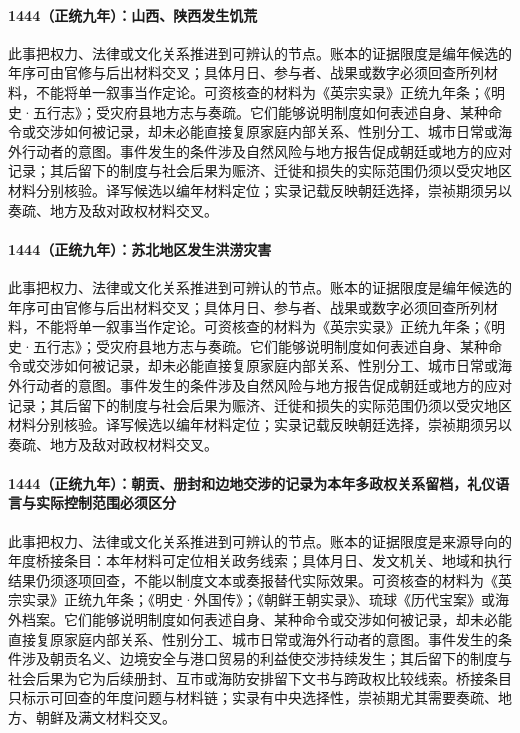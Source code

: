\paragraph{1444（正统九年）：山西、陕西发生饥荒} 此事把权力、法律或文化关系推进到可辨认的节点。账本的证据限度是编年候选的年序可由官修与后出材料交叉；具体月日、参与者、战果或数字必须回查所列材料，不能将单一叙事当作定论。可资核查的材料为《英宗实录》正统九年条；《明史·五行志》；受灾府县地方志与奏疏。它们能够说明制度如何表述自身、某种命令或交涉如何被记录，却未必能直接复原家庭内部关系、性别分工、城市日常或海外行动者的意图。事件发生的条件涉及自然风险与地方报告促成朝廷或地方的应对记录；其后留下的制度与社会后果为赈济、迁徙和损失的实际范围仍须以受灾地区材料分别核验。译写候选以编年材料定位；实录记载反映朝廷选择，崇祯期须另以奏疏、地方及敌对政权材料交叉。

\paragraph{1444（正统九年）：苏北地区发生洪涝灾害} 此事把权力、法律或文化关系推进到可辨认的节点。账本的证据限度是编年候选的年序可由官修与后出材料交叉；具体月日、参与者、战果或数字必须回查所列材料，不能将单一叙事当作定论。可资核查的材料为《英宗实录》正统九年条；《明史·五行志》；受灾府县地方志与奏疏。它们能够说明制度如何表述自身、某种命令或交涉如何被记录，却未必能直接复原家庭内部关系、性别分工、城市日常或海外行动者的意图。事件发生的条件涉及自然风险与地方报告促成朝廷或地方的应对记录；其后留下的制度与社会后果为赈济、迁徙和损失的实际范围仍须以受灾地区材料分别核验。译写候选以编年材料定位；实录记载反映朝廷选择，崇祯期须另以奏疏、地方及敌对政权材料交叉。

\paragraph{1444（正统九年）：朝贡、册封和边地交涉的记录为本年多政权关系留档，礼仪语言与实际控制范围必须区分} 此事把权力、法律或文化关系推进到可辨认的节点。账本的证据限度是来源导向的年度桥接条目：本年材料可定位相关政务线索；具体月日、发文机关、地域和执行结果仍须逐项回查，不能以制度文本或奏报替代实际效果。可资核查的材料为《英宗实录》正统九年条；《明史·外国传》；《朝鲜王朝实录》、琉球《历代宝案》或海外档案。它们能够说明制度如何表述自身、某种命令或交涉如何被记录，却未必能直接复原家庭内部关系、性别分工、城市日常或海外行动者的意图。事件发生的条件涉及朝贡名义、边境安全与港口贸易的利益使交涉持续发生；其后留下的制度与社会后果为它为后续册封、互市或海防安排留下文书与跨政权比较线索。桥接条目只标示可回查的年度问题与材料链；实录有中央选择性，崇祯期尤其需要奏疏、地方、朝鲜及满文材料交叉。

